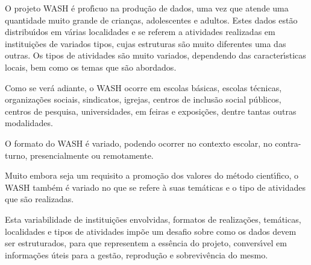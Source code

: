 \documentclass[
12pt,		%
openright,	%
twoside,  %
a4paper,			%
chapter=TITLE,		%
english,			%
french,				%
spanish,			%
brazil				%
]{USPSC-classe/USPSC}
\begin{document}
O projeto WASH \'e prof\'{\i}cuo na produ\c{c}\~ao de dados, uma vez que atende uma quantidade muito grande de crian\c{c}as, adolescentes e adultos. Estes dados est\~ao distribu\'{\i}dos em v\'arias localidades e se referem a atividades realizadas em institui\c{c}\~oes de variados tipos, cujas estruturas s\~ao muito diferentes uma das outras. Os tipos de atividades s\~ao muito variados, dependendo das caracter\'{\i}sticas locais, bem como os temas que s\~ao abordados.














Como se ver\'a adiante, o WASH ocorre  em escolas b\'asicas, escolas t\'ecnicas, organiza\c{c}\~oes sociais, sindicatos, igrejas, centros de inclus\~ao social p\'ublicos, centros de pesquisa, universidades, em feiras e exposi\c{c}\~oes, dentre tantas outras modalidades.














O formato do WASH \'e variado, podendo ocorrer no contexto escolar, no contra-turno, presencialmente ou remotamente.














Muito embora seja um requisito a promo\c{c}\~ao dos valores do m\'etodo cient\'{\i}fico, o WASH tamb\'em \'e variado no que se refere \`a suas tem\'aticas e o tipo de atividades que s\~ao realizadas.














Esta variabilidade de institui\c{c}\~oes envolvidas, formatos de realiza\c{c}\~oes, tem\'aticas, localidades e tipos de atividades imp\~oe um desafio sobre como os dados devem ser estruturados, para que representem a ess\^encia do projeto, convers\'{\i}vel em informa\c{c}\~oes \'uteis para a gest\~ao, reprodu\c{c}\~ao e sobreviv\^encia do mesmo.
\end{document}

